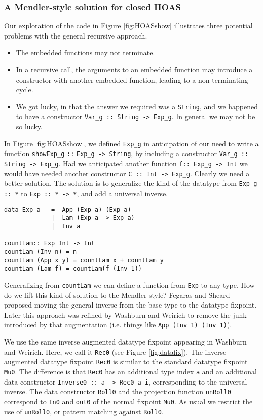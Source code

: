 \documentclass[letterpaper,12pt]{article}
\begin{document}
\subsubsection{A Mendler-style solution for closed HOAS}
\label{sec:bg:showHOAS:msfcata}

Our exploration of the code in Figure \ref{fig:HOASshow} illustrates
three potential problems with the general recursive approach.
\begin{itemize}
\item The embedded functions may not terminate.
\item In a recursive call, the arguments to an embedded function
may introduce a constructor with another embedded function, leading to
a non terminating cycle.
\item We got lucky, in that the answer we required was a \verb|String|, and
we happened to have a constructor \verb|Var_g :: String -> Exp_g|.
In general we may not be so lucky.
\end{itemize}

In Figure \ref{fig:HOASshow}, we defined \verb|Exp_g| in anticipation of
our need to write a function \verb|showExp_g| \verb|::| \verb|Exp_g -> String|,
by including a constructor \verb|Var_g :: String -> Exp_g|.
Had we anticipated another function \verb|f:: Exp_g -> Int|
we would have needed another  constructor \verb|C :: Int -> Exp_g|.
Clearly we need a better solution.  The solution is to generalize the kind of
the datatype from \verb|Exp_g :: *| to \verb|Exp :: * -> *|, and add
a universal inverse.
\begin{verbatim}
data Exp a   =  App (Exp a) (Exp a)
             |  Lam (Exp a -> Exp a)
             |  Inv a

countLam:: Exp Int -> Int   
countLam (Inv n) = n
countLam (App x y) = countLam x + countLam y
countLam (Lam f) = countLam(f (Inv 1))
\end{verbatim}
Generalizing from \verb|countLam| we can define a function from \verb|Exp|
to any type. How do we lift this kind of solution to the Mendler-style?
Fegaras and Sheard\cite{FegShe96} proposed moving the general inverse from
the base type to the datatype fixpoint. Later this approach was refined by
Washburn and Weirich\cite{bgb} to remove the junk introduced by
that augmentation (i.e. things like \verb|App (Inv 1) (Inv 1)|).

We use the same inverse augmented datatype fixpoint appearing in
Washburn and Weirich\cite{bgb}. 
Here, we call it \verb|Rec0| (see Figure \ref{fig:datafix}).
The inverse augmented datatype fixpoint \verb|Rec0| is similar to
the standard datatype fixpoint \verb|Mu0|.
The difference is that \verb|Rec0| has an additional type index \verb|a|
and an additional data constructor \verb|Inverse0 :: a -> Rec0 a i|,
corresponding to the universal inverse.
The data constructor \verb|Roll0| and the projection function \verb|unRoll0|
correspond to \verb|In0| and \verb|out0| of the normal fixpoint \verb|Mu0|.
As usual we restrict the use of \verb|unRoll0|, or pattern matching against
\verb|Roll0|.
\end{document}
